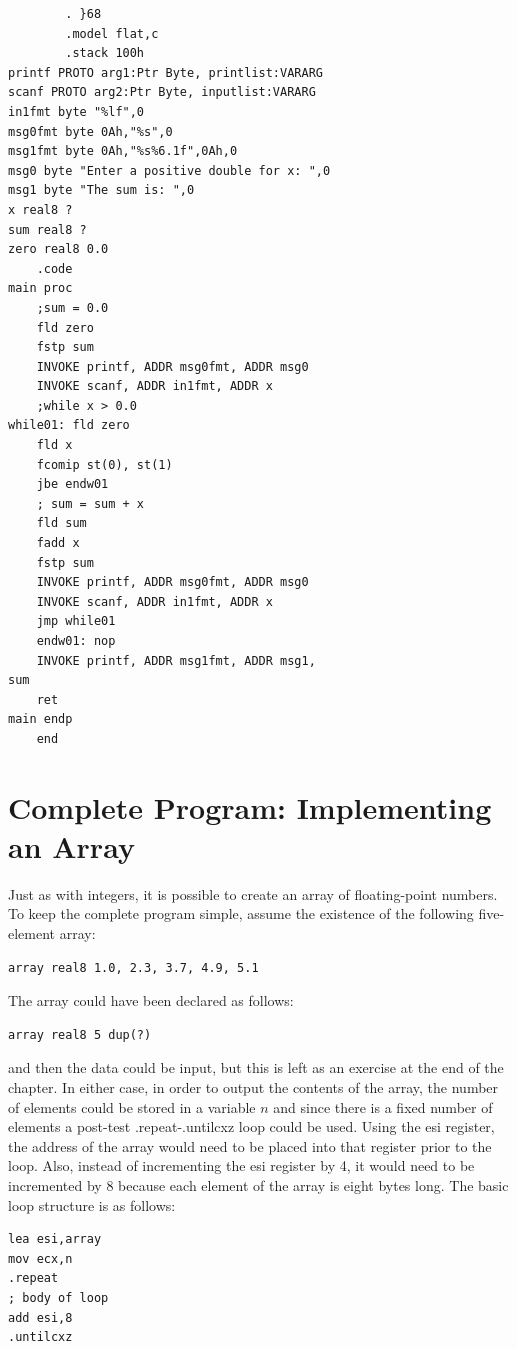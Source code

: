 \documentclass[10pt]{book}
\begin{document}
\begin{verbatim}
        . }68
        .model flat,c
        .stack 100h
printf PROTO arg1:Ptr Byte, printlist:VARARG
scanf PROTO arg2:Ptr Byte, inputlist:VARARG
in1fmt byte "%lf",0
msg0fmt byte 0Ah,"%s",0
msg1fmt byte 0Ah,"%s%6.1f",0Ah,0
msg0 byte "Enter a positive double for x: ",0
msg1 byte "The sum is: ",0
x real8 ?
sum real8 ?
zero real8 0.0
    .code
main proc
    ;sum = 0.0
    fld zero
    fstp sum
    INVOKE printf, ADDR msg0fmt, ADDR msg0
    INVOKE scanf, ADDR in1fmt, ADDR x
    ;while x > 0.0
while01: fld zero
    fld x
    fcomip st(0), st(1)
    jbe endw01
    ; sum = sum + x
    fld sum
    fadd x
    fstp sum
    INVOKE printf, ADDR msg0fmt, ADDR msg0
    INVOKE scanf, ADDR in1fmt, ADDR x
    jmp while01
    endw01: nop
    INVOKE printf, ADDR msg1fmt, ADDR msg1,
sum
    ret
main endp
    end
\end{verbatim}

\section{Complete Program: Implementing an Array}
Just as with integers, it is possible to create an array of floating-point numbers. To keep the complete program simple, assume the existence of the following five-element array:
\begin{verbatim}
array real8 1.0, 2.3, 3.7, 4.9, 5.1
\end{verbatim}

The array could have been declared as follows:

\begin{verbatim}
array real8 5 dup(?)
\end{verbatim}

and then the data could be input, but this is left as an exercise at the end of the chapter. In either case, in order to output the contents of the array, the number of elements could be stored in a variable $n$ and since there is a fixed number of elements a post-test .repeat-.untilcxz loop could be used. Using the esi register, the address of the array would need to be placed into that register prior to the loop. Also, instead of incrementing the esi register by 4, it would need to be incremented by 8 because each element of the array is eight bytes long. The basic loop structure is as follows:

\begin{verbatim}
lea esi,array
mov ecx,n
.repeat
; body of loop
add esi,8
.untilcxz
\end{verbatim}
\end{document}
